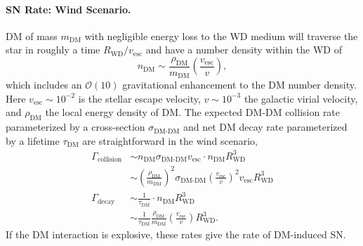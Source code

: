 \documentclass[twocolumn,preprintnumbers,amsmath,amssymb,prd, superscriptaddress]{revtex4} %
\newcommand{\OO}{\mathcal{O}}
\def\r{\right)}
\def\l{\left(}
\begin{document}
\paragraph{SN Rate: Wind Scenario.}
DM of mass $m_\text{DM}$ with negligible energy loss to the WD medium will traverse the star in roughly a time $R_\text{WD}/v_\text{esc}$ and have a number density within the WD of
\begin{equation}
n_\text{DM} \sim \frac{\rho_{\text{DM}}}{m_\text{DM}} \l \frac{v_\text{esc}}{v}\r,
\end{equation}
which includes an $\OO(10)$ gravitational enhancement to the DM number density.
Here $v_\text{esc} \sim 10^{-2} $ is the stellar escape velocity, $v \sim 10^{-3}$ the galactic virial velocity, and $\rho_\text{DM}$ the local energy density of DM.
The expected DM-DM collision rate parameterized by a cross-section $\sigma_\text{DM-DM}$ and net DM decay rate parameterized by a lifetime $\tau_\text{DM}$ are straightforward in the wind scenario,
\begin{align}
  \Gamma_\text{collision}
  &\sim n_\text{DM} \sigma_\text{DM-DM} v_\text{esc}
  \cdot n_\text{DM} R_\text{WD}^3 \\
  &\sim \l \frac{\rho_\text{DM}}{m_\text{DM}} \r^2 \sigma_\text{DM-DM} \l \frac{v_\text{esc}}{v}\r^2 v_\text{esc} R_\text{WD}^3 \\
  \label{eq:collisionDM}
  \Gamma_\text{decay}
  &\sim \frac{1}{\tau_\text{DM}} \cdot n_\text{DM} R_\text{WD}^3 \\
  &\sim \frac{1}{\tau_\text{DM}} \frac{\rho_{\text{DM}}}{m_\text{DM}} \l \frac{v_\text{esc}}{v}\r R_\text{WD}^3.
  \label{eq:taugamma}
\end{align}
If the DM interaction is explosive, these rates give the rate of DM-induced SN.
\end{document}
